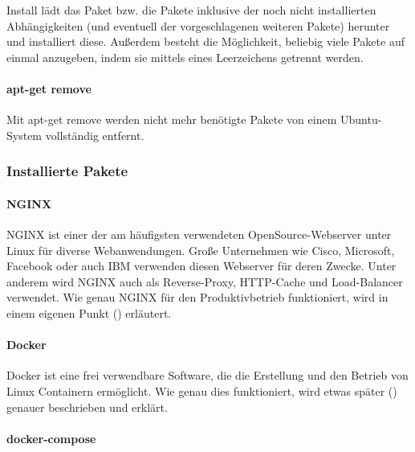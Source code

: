 \documentclass[
]{article}
\begin{document}
Install lädt das Paket bzw. die Pakete inklusive der noch nicht
installierten Abhängigkeiten (und eventuell der vorgeschlagenen weiteren
Pakete) herunter und installiert diese. Außerdem besteht die
Möglichkeit, beliebig viele Pakete auf einmal anzugeben, indem sie
mittels eines Leerzeichens getrennt werden.

\hypertarget{apt-get-remove}{%
\paragraph{apt-get remove}\label{apt-get-remove}}

Mit apt-get remove werden nicht mehr benötigte Pakete von einem
Ubuntu-System vollständig entfernt.

\hypertarget{installierte-pakete}{%
\subsubsection{Installierte Pakete}\label{installierte-pakete}}

\hypertarget{nginx}{%
\paragraph{NGINX}\label{nginx}}

NGINX ist einer der am häufigsten verwendeten OpenSource-Webserver unter
Linux für diverse Webanwendungen. Große Unternehmen wie Cisco,
Microsoft, Facebook oder auch IBM verwenden diesen Webserver für deren
Zwecke. Unter anderem wird NGINX auch als Reverse-Proxy, HTTP-Cache und
Load-Balancer verwendet. Wie genau NGINX für den Produktivbetrieb
funktioniert, wird in einem eigenen Punkt
() erläutert.

\hypertarget{docker}{%
\paragraph{Docker}\label{docker}}

Docker ist eine frei verwendbare Software, die die Erstellung und den
Betrieb von Linux Containern ermöglicht. Wie genau dies funktioniert,
wird etwas später () genauer
beschrieben und erklärt.

\hypertarget{docker-compose}{%
\paragraph{docker-compose}\label{docker-compose}}
\end{document}
